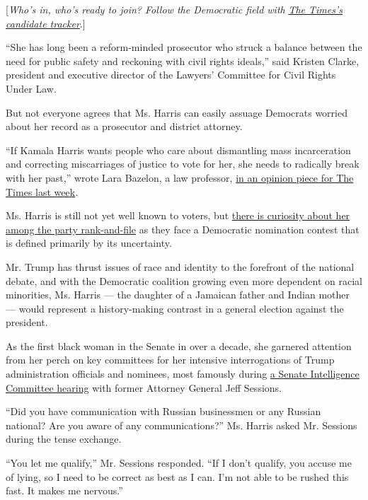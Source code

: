 {[}\emph{Who's in, who's ready to join? Follow the Democratic field
with}
\href{https://www.nytimes3xbfgragh.onion/interactive/2019/us/politics/2020-presidential-candidates.html?action=click\&module=Top\%20Stories\&pgtype=Homepage}{\emph{The
Times's candidate tracker}}.{]}

``She has long been a reform-minded prosecutor who struck a balance
between the need for public safety and reckoning with civil rights
ideals,'' said Kristen Clarke, president and executive director of the
Lawyers' Committee for Civil Rights Under Law.

But not everyone agrees that Ms. Harris can easily assuage Democrats
worried about her record as a prosecutor and district attorney.

``If Kamala Harris wants people who care about dismantling mass
incarceration and correcting miscarriages of justice to vote for her,
she needs to radically break with her past,'' wrote Lara Bazelon, a law
professor,
\href{https://www.nytimes3xbfgragh.onion/2019/01/17/opinion/kamala-harris-criminal-justice.html}{in
an opinion piece for The Times last week}.

Ms. Harris is still not yet well known to voters, but
\href{https://www.nytimes3xbfgragh.onion/2019/01/12/us/politics/kamala-harris-democrats.html}{there
is curiosity about her among the party rank-and-file} as they face a
Democratic nomination contest that is defined primarily by its
uncertainty.

Mr. Trump has thrust issues of race and identity to the forefront of the
national debate, and with the Democratic coalition growing even more
dependent on racial minorities, Ms. Harris --- the daughter of a
Jamaican father and Indian mother --- would represent a history-making
contrast in a general election against the president.

As the first black woman in the Senate in over a decade, she garnered
attention from her perch on key committees for her intensive
interrogations of Trump administration officials and nominees, most
famously during
\href{https://www.nytimes3xbfgragh.onion/2017/06/13/us/politics/kamala-harris-interrupted-jeff-sessions.html}{a
Senate Intelligence Committee hearing} with former Attorney General Jeff
Sessions.

``Did you have communication with Russian businessmen or any Russian
national? Are you aware of any communications?'' Ms. Harris asked Mr.
Sessions during the tense exchange.

``You let me qualify,'' Mr. Sessions responded. ``If I don't qualify,
you accuse me of lying, so I need to be correct as best as I can. I'm
not able to be rushed this fast. It makes me nervous.''


